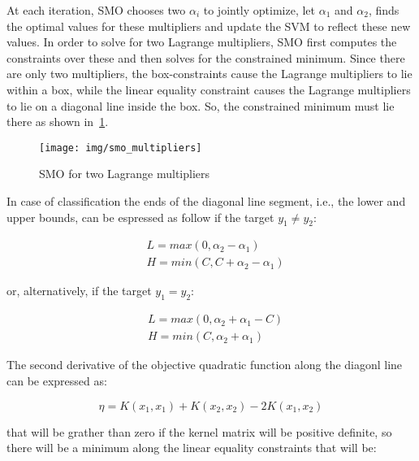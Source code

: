 At each iteration, SMO chooses two $\alpha_i$ to jointly optimize, let $\alpha_1$ and $\alpha_2$, finds the optimal values for these multipliers and update the SVM to reflect these new values. In order to solve for two Lagrange multipliers, SMO first computes the constraints over these and then solves for the constrained minimum. Since there are only two multipliers, the box-constraints cause the Lagrange multipliers to lie within a box, while the linear equality constraint causes the Lagrange multipliers to lie on a diagonal line inside the box. So, the constrained minimum must lie there as shown in~\ref{fig:smo_lagrange_multipliers}.

\begin{figure}[h!]
	\centering
	\texttt{[image: img/smo\_multipliers]}
	\caption{SMO for two Lagrange multipliers}
	\label{fig:smo_lagrange_multipliers}
\end{figure}

In case of classification the ends of the diagonal line segment, i.e., the lower and upper bounds, can be espressed as follow if the target $y_1 \ne y_2$:

\begin{equation} \label{eq:smo_svc_bounds_update1}
	\begin{aligned}
		& L = max(0, \alpha_2 - \alpha_1) \\
		& H = min(C, C + \alpha_2 - \alpha_1)
	\end{aligned}
\end{equation}

or, alternatively, if the target $y_1 = y_2$:

\begin{equation} \label{eq:smo_svc_bounds_update2}
	\begin{aligned}
		& L = max(0, \alpha_2 + \alpha_1 - C) \\
		& H = min(C, \alpha_2 + \alpha_1)
	\end{aligned}
\end{equation}

The second derivative of the objective quadratic function along the diagonl line can be expressed as:

\begin{equation} \label{eq:smo_eta}
	\eta = K(x_1, x_1) + K(x_2, x_2) - 2K(x_1, x_2)
\end{equation}

that will be grather than zero if the kernel matrix will be positive definite, so there will be a minimum along the linear equality constraints that will be:

